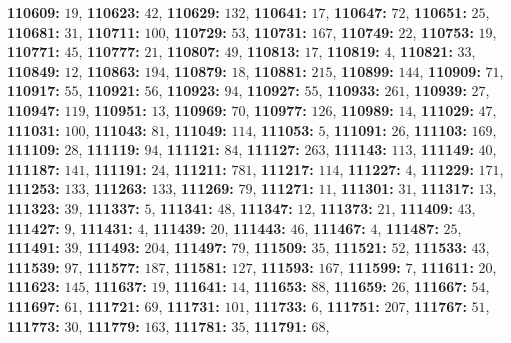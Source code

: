 \textsf{\bfseries 110609:} $19$, \textsf{\bfseries 110623:} $42$, \textsf{\bfseries 110629:} $132$, \textsf{\bfseries 110641:} $17$, \textsf{\bfseries 110647:} $72$, \textsf{\bfseries 110651:} $25$, \textsf{\bfseries 110681:} $31$, \textsf{\bfseries 110711:} $100$, \textsf{\bfseries 110729:} $53$, \textsf{\bfseries 110731:} $167$, \textsf{\bfseries 110749:} $22$, \textsf{\bfseries 110753:} $19$, \textsf{\bfseries 110771:} $45$, \textsf{\bfseries 110777:} $21$, \textsf{\bfseries 110807:} $49$, \textsf{\bfseries 110813:} $17$, \textsf{\bfseries 110819:} $4$, \textsf{\bfseries 110821:} $33$, \textsf{\bfseries 110849:} $12$, \textsf{\bfseries 110863:} $194$, \textsf{\bfseries 110879:} $18$, \textsf{\bfseries 110881:} $215$, \textsf{\bfseries 110899:} $144$, \textsf{\bfseries 110909:} $71$, \textsf{\bfseries 110917:} $55$, \textsf{\bfseries 110921:} $56$, \textsf{\bfseries 110923:} $94$, \textsf{\bfseries 110927:} $55$, \textsf{\bfseries 110933:} $261$, \textsf{\bfseries 110939:} $27$, \textsf{\bfseries 110947:} $119$, \textsf{\bfseries 110951:} $13$, \textsf{\bfseries 110969:} $70$, \textsf{\bfseries 110977:} $126$, \textsf{\bfseries 110989:} $14$, \textsf{\bfseries 111029:} $47$, \textsf{\bfseries 111031:} $100$, \textsf{\bfseries 111043:} $81$, \textsf{\bfseries 111049:} $114$, \textsf{\bfseries 111053:} $5$, \textsf{\bfseries 111091:} $26$, \textsf{\bfseries 111103:} $169$, \textsf{\bfseries 111109:} $28$, \textsf{\bfseries 111119:} $94$, \textsf{\bfseries 111121:} $84$, \textsf{\bfseries 111127:} $263$, \textsf{\bfseries 111143:} $113$, \textsf{\bfseries 111149:} $40$, \textsf{\bfseries 111187:} $141$, \textsf{\bfseries 111191:} $24$, \textsf{\bfseries 111211:} $781$, \textsf{\bfseries 111217:} $114$, \textsf{\bfseries 111227:} $4$, \textsf{\bfseries 111229:} $171$, \textsf{\bfseries 111253:} $133$, \textsf{\bfseries 111263:} $133$, \textsf{\bfseries 111269:} $79$, \textsf{\bfseries 111271:} $11$, \textsf{\bfseries 111301:} $31$, \textsf{\bfseries 111317:} $13$, \textsf{\bfseries 111323:} $39$, \textsf{\bfseries 111337:} $5$, \textsf{\bfseries 111341:} $48$, \textsf{\bfseries 111347:} $12$, \textsf{\bfseries 111373:} $21$, \textsf{\bfseries 111409:} $43$, \textsf{\bfseries 111427:} $9$, \textsf{\bfseries 111431:} $4$, \textsf{\bfseries 111439:} $20$, \textsf{\bfseries 111443:} $46$, \textsf{\bfseries 111467:} $4$, \textsf{\bfseries 111487:} $25$, \textsf{\bfseries 111491:} $39$, \textsf{\bfseries 111493:} $204$, \textsf{\bfseries 111497:} $79$, \textsf{\bfseries 111509:} $35$, \textsf{\bfseries 111521:} $52$, \textsf{\bfseries 111533:} $43$, \textsf{\bfseries 111539:} $97$, \textsf{\bfseries 111577:} $187$, \textsf{\bfseries 111581:} $127$, \textsf{\bfseries 111593:} $167$, \textsf{\bfseries 111599:} $7$, \textsf{\bfseries 111611:} $20$, \textsf{\bfseries 111623:} $145$, \textsf{\bfseries 111637:} $19$, \textsf{\bfseries 111641:} $14$, \textsf{\bfseries 111653:} $88$, \textsf{\bfseries 111659:} $26$, \textsf{\bfseries 111667:} $54$, \textsf{\bfseries 111697:} $61$, \textsf{\bfseries 111721:} $69$, \textsf{\bfseries 111731:} $101$, \textsf{\bfseries 111733:} $6$, \textsf{\bfseries 111751:} $207$, \textsf{\bfseries 111767:} $51$, \textsf{\bfseries 111773:} $30$, \textsf{\bfseries 111779:} $163$, \textsf{\bfseries 111781:} $35$, \textsf{\bfseries 111791:} $68$, 
